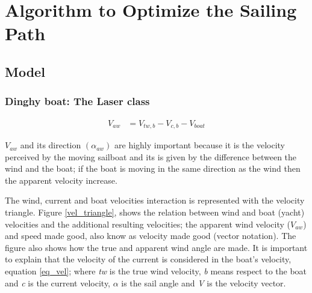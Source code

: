 \chapter{Algorithm to Optimize the Sailing Path}

\section{Model}
\subsection{Dinghy boat: The Laser class}

\begin{equation}
\label{eq_vel}
\begin{aligned}
V_{aw} & = V_{tw,b} - V_{c,b} - V_{boat}
\end{aligned}
\end {equation}



$V_{aw}$ and its direction $( \alpha_{aw})$ are highly important because it is the velocity perceived by the moving sailboat and its is given by the difference between the wind and the boat; if the boat is moving in the same direction as the wind then the apparent velocity increase. \par 

The wind, current and boat velocities interaction is represented with the velocity triangle.  Figure \ref{vel_triangle}, shows the relation between wind and boat (yacht) velocities and the additional resulting velocities; the apparent wind velocity ($V_{aw}$) and speed made good,  also know as velocity made good (vector notation). The figure also shows how the true and apparent wind angle are made. It is important to explain that the velocity of the current is considered in the boat's velocity, equation \ref{eq_vel}; where \textit{tw} is the true wind velocity, \textit{b} means respect to the boat and \textit{c} is the current velocity, $\alpha$ is the sail angle and \textit{V} is the velocity vector. \par